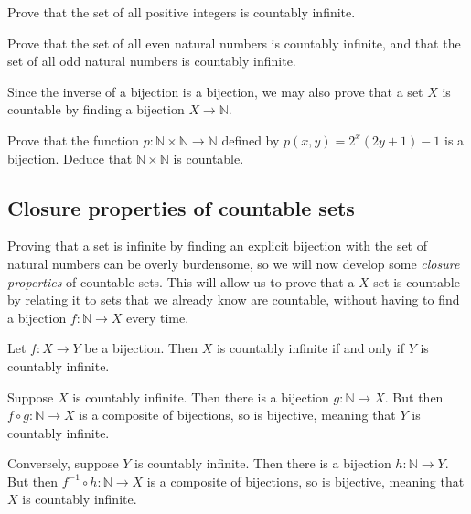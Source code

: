 \begin{exercise}
\label{exPositiveIntegersCountablyInfinite}
Prove that the set of all positive integers is countably infinite.
\end{exercise}

\begin{exercise}
\label{exEvenOddNaturalNumbersCountablyInfinite}
Prove that the set of all even natural numbers is countably infinite, and that the set of all odd natural numbers is countably infinite.
\end{exercise}

Since the inverse of a bijection is a bijection, we may also prove that a set $X$ is countable by finding a bijection $X \to \mathbb{N}$.

\begin{exercise}
Prove that the function $p : \mathbb{N} \times \mathbb{N} \to \mathbb{N}$ defined by $p(x,y) = 2^x(2y+1)-1$ is a bijection. Deduce that $\mathbb{N} \times \mathbb{N}$ is countable.
\end{exercise}

\subsection*{Closure properties of countable sets}

Proving that a set is infinite by finding an explicit bijection with the set of natural numbers can be overly burdensome, so we will now develop some \textit{closure properties} of countable sets. This will allow us to prove that a $X$ set is countable by relating it to sets that we already know are countable, without having to find a bijection $f : \mathbb{N} \to X$ every time.

\begin{proposition}
\label{propCountablyInfiniteFromBijection}
Let $f : X \to Y$ be a bijection. Then $X$ is countably infinite if and only if $Y$ is countably infinite.
\end{proposition}

\begin{cproof}
Suppose $X$ is countably infinite. Then there is a bijection $g : \mathbb{N} \to X$. But then $f \circ g : \mathbb{N} \to X$ is a composite of bijections, so is bijective, meaning that $Y$ is countably infinite.

Conversely, suppose $Y$ is countably infinite. Then there is a bijection $h : \mathbb{N} \to Y$. But then $f^{-1} \circ h : \mathbb{N} \to X$ is a composite of bijections, so is bijective, meaning that $X$ is countably infinite.
\end{cproof}

